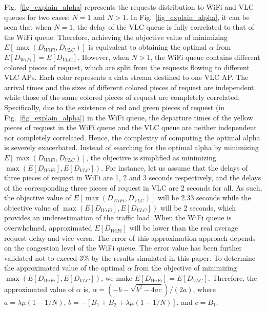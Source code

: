 \documentclass[10pt,journal]{IEEEtran}
\begin{document}
Fig.~\ref{fig_explain_alpha} represents the requests distribution to WiFi and VLC queues for two cases: $N=1$ and $N>1$. In Fig.~\ref{fig_explain_alpha}, it can be seen that when $N=1$, the delay of the VLC queue is fully correlated to that of the WiFi queue. Therefore, achieving the objective value of minimizing $E[\max(D_{WiFi},D_{VLC})]$ is equivalent to obtaining the optimal $\alpha$ from $E[D_{WiFi}]=E[D_{VLC}]$. However, when $N>1$, the WiFi queue contains different colored pieces of request, which are split from the requests flowing to different VLC APs. Each color represents a data stream destined to one VLC AP. The arrival times and the sizes of different colored pieces of request are independent while those of the same colored pieces of request are completely correlated. Specifically, due to the existence of red and green pieces of request (in Fig.~\ref{fig_explain_alpha}) in the WiFi queue, the departure times of the yellow pieces of request in the WiFi queue and the VLC queue are neither independent nor completely correlated. Hence, the complexity of computing the optimal alpha is severely exacerbated. Instead of searching for the optimal alpha by minimizing $E[\max(D_{WiFi},D_{VLC})]$, the objective is simplified as minimizing $\max(E[D_{WiFi}],E[D_{VLC}])$. For instance, let us assume that the delays of three pieces of request in WiFi are 1, 2 and 3 seconds respectively, and the delays of the corresponding three pieces of request in VLC are 2 seconds for all. As such, the objective value of $E[\max(D_{WiFi},D_{VLC})]$ will be 2.33 seconds while the objective value of $\max(E[D_{WiFi}],E[D_{VLC}])$ will be 2 seconds, which provides an underestimation of the traffic load. When the WiFi queue is overwhelmed, approximated $E[D_{WiFi}]$ will be lower than the real average request delay and vice versa. The error of this approximation approach depends on the congestion level of the WiFi queue. The error value has been further validated not to exceed 3\% by the results simulated in this paper. To determine the approximated value of the optimal $\alpha$ from the objective of minimizing $\max(E[D_{WiFi}],E[D_{VLC}])$, we make $E[D_{WiFi}]=E[D_{VLC}]$. Therefore, the approximated value of $\alpha$ is, $\alpha=(-b-\sqrt{b^{2}-4ac})/(2a)$, where $a=\lambda\mu(1-1/N)$, $b=-[B_{1}+B_{2}+\lambda\mu(1-1/N)]$, and $c=B_{1}$.
\end{document}
